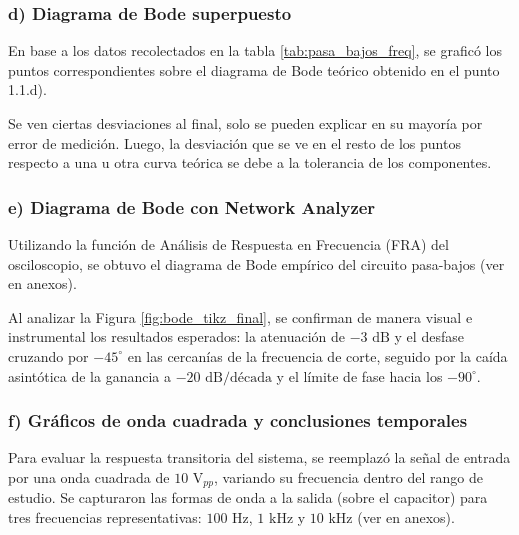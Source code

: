 \documentclass{article}
\begin{document}
                \subsubsection*{d) Diagrama de Bode superpuesto}
                En base a los datos recolectados en la tabla \ref{tab:pasa_bajos_freq}, se graficó los puntos correspondientes sobre el diagrama de Bode teórico obtenido en el punto 1.1.d).

                Se ven ciertas desviaciones al final, solo se pueden explicar en su mayoría por error de medición. Luego, la desviación que se ve en el resto de los puntos respecto a una u otra curva teórica se debe a la tolerancia de los componentes.
                \subsubsection*{e) Diagrama de Bode con Network Analyzer}
        
                Utilizando la función de Análisis de Respuesta en Frecuencia (FRA) del osciloscopio, se obtuvo el diagrama de Bode empírico del circuito pasa-bajos (ver en anexos).

                Al analizar la Figura \ref{fig:bode_tikz_final}, se confirman de manera visual e instrumental los resultados esperados: la atenuación de $-3\text{ dB}$ y el desfase cruzando por $-45^\circ$ en las cercanías de la frecuencia de corte, seguido por la caída asintótica de la ganancia a $-20\text{ dB/década}$ y el límite de fase hacia los $-90^\circ$.
        
        
                
        
                \subsubsection*{f) Gráficos de onda cuadrada y conclusiones temporales}
        
                    Para evaluar la respuesta transitoria del sistema, 
                    se reemplazó la señal de entrada por una onda cuadrada de $10\text{ V}_{pp}$,
                     variando su frecuencia dentro del rango de estudio. Se capturaron las formas
                      de onda a la salida (sobre el capacitor) para tres frecuencias representativas:
                       $100\text{ Hz}$, $1\text{ kHz}$ y $10\text{ kHz}$ (ver en anexos).
        
\end{document}
